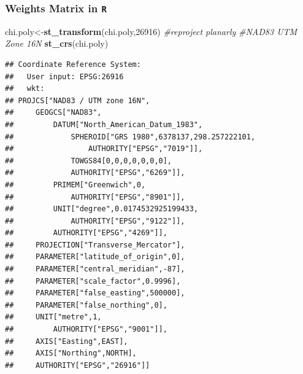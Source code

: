 \documentclass[
  shownotes,
  xcolor={svgnames},
  hyperref={colorlinks,citecolor=DarkBlue,linkcolor=DarkRed,urlcolor=DarkBlue}
  ]{beamer}
\newenvironment{Shaded}{\begin{snugshade}}{\end{snugshade}}
\newcommand{\CommentTok}[1]{\textcolor[rgb]{0.56,0.35,0.01}{\textit{#1}}}
\newcommand{\DecValTok}[1]{\textcolor[rgb]{0.00,0.00,0.81}{#1}}
\newcommand{\KeywordTok}[1]{\textcolor[rgb]{0.13,0.29,0.53}{\textbf{#1}}}
\newcommand{\NormalTok}[1]{#1}
\begin{document}
\begin{frame}[fragile]
\frametitle{Weights Matrix in \texttt{R}}

\begin{scriptsize}

\begin{Shaded}
\begin{Highlighting}[]
\NormalTok{chi.poly\textless{}{-}}\KeywordTok{st\_transform}\NormalTok{(chi.poly,}\DecValTok{26916}\NormalTok{) }\CommentTok{\#reproject planarly}
\CommentTok{\#NAD83 UTM Zone 16N}
\KeywordTok{st\_crs}\NormalTok{(chi.poly)}
\end{Highlighting}
\end{Shaded}
\end{scriptsize}
\begin{tiny}
\begin{verbatim}
## Coordinate Reference System:
##   User input: EPSG:26916 
##   wkt:
## PROJCS["NAD83 / UTM zone 16N",
##     GEOGCS["NAD83",
##         DATUM["North_American_Datum_1983",
##             SPHEROID["GRS 1980",6378137,298.257222101,
##                 AUTHORITY["EPSG","7019"]],
##             TOWGS84[0,0,0,0,0,0,0],
##             AUTHORITY["EPSG","6269"]],
##         PRIMEM["Greenwich",0,
##             AUTHORITY["EPSG","8901"]],
##         UNIT["degree",0.0174532925199433,
##             AUTHORITY["EPSG","9122"]],
##         AUTHORITY["EPSG","4269"]],
##     PROJECTION["Transverse_Mercator"],
##     PARAMETER["latitude_of_origin",0],
##     PARAMETER["central_meridian",-87],
##     PARAMETER["scale_factor",0.9996],
##     PARAMETER["false_easting",500000],
##     PARAMETER["false_northing",0],
##     UNIT["metre",1,
##         AUTHORITY["EPSG","9001"]],
##     AXIS["Easting",EAST],
##     AXIS["Northing",NORTH],
##     AUTHORITY["EPSG","26916"]]
\end{verbatim}

\end{tiny}
\end{frame}
\end{document}
